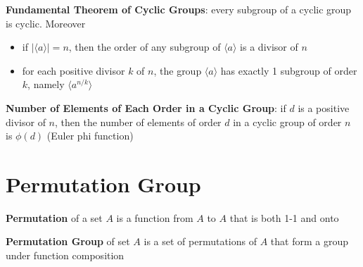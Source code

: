 \documentclass{article}
\begin{document}
  \bigskip

  \textbf{Fundamental Theorem of Cyclic Groups}: every subgroup of a cyclic group is cyclic. Moreover
  \begin{itemize}
    \item if $|\langle a \rangle | = n$, then the order of any subgroup of $\langle a \rangle$ is a divisor of $n$
    \item for each positive divisor $k$ of $n$, the group $\langle a \rangle$ has exactly 1 subgroup of order $k$, namely $\langle a^{n/k} \rangle$
  \end{itemize}

  \bigskip

  \textbf{Number of Elements of Each Order in a Cyclic Group}: if $d$ is a positive divisor of $n$, then the number of elements of order $d$ in a cyclic group of order $n$ is $\phi(d)$ (Euler phi function)

  \section{Permutation Group}
  \textbf{Permutation} of a set $A$ is a function from $A$ to $A$ that is both 1-1 and onto

  \textbf{Permutation Group} of set $A$ is a set of permutations of $A$ that form a group under function composition
\end{document}
